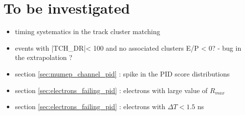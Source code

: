 

\section{To be investigated} 
\label{sec:to_be_investigated}

\begin{itemize}
\item 
  timing systematics in the track cluster matching
\item 
  events with |TCH\_DR|< 100 and no associated clusters E/P < 0? - bug in the extrapolation ?
\item
  section \ref{sec:mumep_channel_pid} : spike in the PID score distributions
\item
  section \ref{sec:electrons_failing_pid} : electrons with large value of $R_{max}$
\item
  section \ref{sec:electrons_failing_pid} : electrons with $\Delta{T} < 1.5$ ns
\end{itemize}
